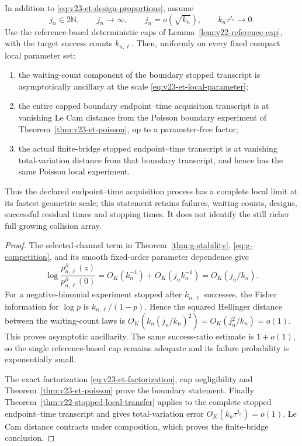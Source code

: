 \begin{theorem}
\label{thm:v23-complete-et}
In addition to \eqref{eq:v23-et-design-proportions}, assume
\begin{equation}\label{eq:v23-et-flight-conditions}
 j_n\in2\mathbb N,\qquad j_n\to\infty,\qquad
 j_n=o(\sqrt{k_n}),\qquad k_n\tau^{j_n}\to0.
\end{equation}
Use the reference-based deterministic caps of
Lemma~\ref{lem:v22-reference-cap}, with the target success counts
\(k_{n,\ell}\).  Then, uniformly on every fixed compact local parameter set:
\begin{enumerate}
\item the waiting-count component of the boundary stopped transcript is
asymptotically ancillary at the scale \eqref{eq:v23-et-local-parameter};
\item the entire capped boundary endpoint--time acquisition transcript is at
vanishing Le Cam distance from the Poisson boundary experiment of
Theorem~\ref{thm:v23-et-poisson}, up to a parameter-free factor;
\item the actual finite-bridge stopped endpoint--time transcript is at
vanishing total-variation distance from that boundary transcript, and hence
has the same Poisson local experiment.
\end{enumerate}
Thus the declared endpoint--time acquisition process has a complete local
limit at its fastest geometric scale; this statement retains failures,
waiting counts, designs, successful residual times and stopping times.  It
does not identify the still richer full growing collision array.
\end{theorem}

\begin{proof}
The selected-channel term in Theorem~\ref{thm:g-stability},
\eqref{eq:g-competition}, and its smooth fixed-order parameter dependence give
\[
 \log\frac{p^\partial_{n,\ell}(z)}
          {p^\partial_{n,\ell}(0)}
 =O_K(k_n^{-1})+O_K(j_nk_n^{-1})
 =O_K(j_n/k_n).
\]
For a negative-binomial experiment stopped after \(k_{n,\ell}\) successes,
the Fisher information for \(\log p\) is
\(k_{n,\ell}/(1-p)\).  Hence the squared Hellinger distance between the
waiting-count laws is
\(O_K(k_n(j_n/k_n)^2)=O_K(j_n^2/k_n)=o(1)\).
This proves asymptotic ancillarity.  The same success-ratio estimate is
\(1+o(1)\), so the single reference-based cap remains adequate and its failure
probability is exponentially small.

The exact factorization \eqref{eq:v23-et-factorization}, cap negligibility and
Theorem~\ref{thm:v23-et-poisson} prove the boundary statement.  Finally
Theorem~\ref{thm:v22-stopped-local-transfer} applies to the complete stopped
endpoint--time transcript and gives total-variation error
\(O_K(k_n\tau^{j_n})=o(1)\).  Le Cam distance contracts under composition,
which proves the finite-bridge conclusion.
\end{proof}

